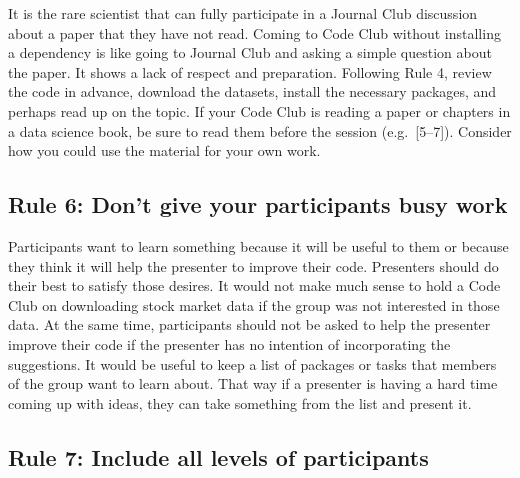 \documentclass[
  11pt,
]{article}
\begin{document}
It is the rare scientist that can fully participate in a Journal Club
discussion about a paper that they have not read. Coming to Code Club
without installing a dependency is like going to Journal Club and asking
a simple question about the paper. It shows a lack of respect and
preparation. Following Rule 4, review the code in advance, download the
datasets, install the necessary packages, and perhaps read up on the
topic. If your Code Club is reading a paper or chapters in a data
science book, be sure to read them before the session (e.g.~{[}5--7{]}).
Consider how you could use the material for your own work.

\hypertarget{rule-6-dont-give-your-participants-busy-work}{%
\subsection{Rule 6: Don't give your participants busy
work}\label{rule-6-dont-give-your-participants-busy-work}}

Participants want to learn something because it will be useful to them
or because they think it will help the presenter to improve their code.
Presenters should do their best to satisfy those desires. It would not
make much sense to hold a Code Club on downloading stock market data if
the group was not interested in those data. At the same time,
participants should not be asked to help the presenter improve their
code if the presenter has no intention of incorporating the suggestions.
It would be useful to keep a list of packages or tasks that members of
the group want to learn about. That way if a presenter is having a hard
time coming up with ideas, they can take something from the list and
present it.

\hypertarget{rule-7-include-all-levels-of-participants}{%
\subsection{Rule 7: Include all levels of
participants}\label{rule-7-include-all-levels-of-participants}}
\end{document}

